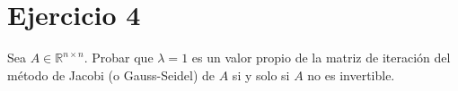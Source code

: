 
\section*{Ejercicio 4}
Sea $A \in \mathbb{R}^{n \times n}$. Probar que $\lambda = 1$ es un valor propio de la matriz de iteración del método de Jacobi (o Gauss-Seidel) de $A$ si y solo si $A$ no es invertible.
